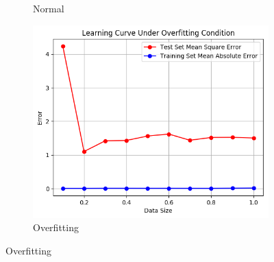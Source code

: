 \documentclass[10pt]{article}
\begin{document}
\begin{figure}[t]
\begin{subfigure}{0.33\textwidth}
      \caption{Normal}
      \label{fig:Normal}
    \end{subfigure}
    \begin{subfigure}{0.33\textwidth}
      \centering
      \includegraphics[width=1\textwidth]{Learning_Curve_Under_Overfitting_Condition}
      \caption{Overfitting}
      \label{fig:Overfitting}
    \end{subfigure}%
\end{figure}
%

%
\end{document}
